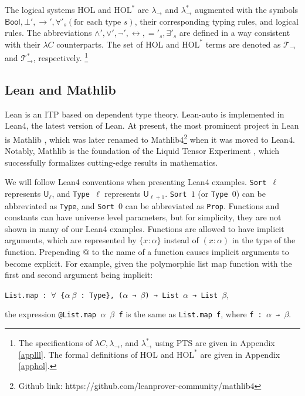   The logical systems HOL and $\text{HOL}^*$ are $\lambda_\to$ and $\lambda_\to^*$ augmented
  with the symbols $\mathsf{Bool}, \bot', \to', \forall'_s(\text{for each type }s)$, their
  corresponding typing rules, and logical rules. The abbreviations $\land', \lor', \neg', \leftrightarrow, ='_s, \exists'_s$
  are defined in a way consistent with their $\lambda C$ counterparts.
  The set of HOL and $\text{HOL}^*$ terms are denoted as $\mathcal{T}_\to$ and $\mathcal{T}_\to^*$, respectively.%
\footnote{
  The specifications of $\lambda C, \lambda_\to$, and $\lambda_\to^*$ using PTS are given in Appendix \ref{applll}.
  The formal definitions of $\text{HOL}$ and $\text{HOL}^*$ are given in Appendix \ref{apphol}.}

\subsection{Lean and Mathlib}\label{sectlean}

  Lean is an ITP based on dependent type theory. Lean-auto
  is implemented in Lean4, the latest version of Lean. At present, the
  most prominent project in Lean is Mathlib \cite{MathlibPaper},
  which was later renamed to Mathlib4\footnote{Github link: https://github.com/leanprover-community/mathlib4}
  when it was moved to Lean4. Notably, Mathlib is the foundation of the
  Liquid Tensor Experiment \cite{LiquidTensor}, which successfully
  formalizes cutting-edge results in mathematics. 

  We will follow Lean4 conventions when presenting Lean4 examples. \texttt{Sort $\ell$}
  represents $\mathsf{U}_\ell$, and \texttt{Type $\ell$} represents $\mathsf{U}_{\ell + 1}$.
  \texttt{Sort $1$} (or \texttt{Type $0$}) can be abbreviated as \texttt{Type},
  and \texttt{Sort $0$} can be abbreviated as \texttt{Prop}.
  Functions and constants can have universe level parameters, but for simplicity,
  they are not shown in many of our Lean4 examples. 
  Functions are allowed to have implicit arguments, which are represented by
  $\{x : \alpha\}$ instead of $(x : \alpha)$ in the type of the function.
  Prepending \textrm{@} to the name of a function causes implicit arguments
  to become explicit. For example, given the polymorphic list map function
  with the first and second argument being implicit:

  \centerline{\texttt{List.map : $\forall$ \{$\alpha \ \beta$ : Type\}, ($\alpha$ → $\beta$) → List $\alpha$ → List $\beta$},}
  
  \noindent the expression \texttt{@List.map $\alpha$ $\beta$ f} is the same as \texttt{List.map f}, where \texttt{f : $\alpha$ → $\beta$}.

